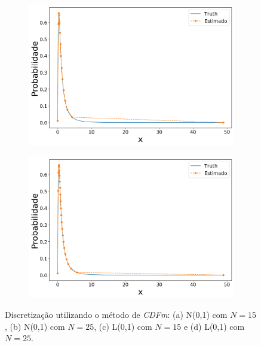 \begin{figure}[H]
	
	\begin{subfigure}[b]{0.45\textwidth}
		\centering 
		\includegraphics[width=\linewidth]{./figuras/CDFm_lognormal_15}
		\caption{}
		\label{fig:cdf_log15}
	\end{subfigure}
	\hfill
	\begin{subfigure}[b]{0.45\textwidth}
		\centering 
		\includegraphics[width=\linewidth]{./figuras/CDFm_lognormal_25}
		\caption{}
		\label{fig:cdf_log25}
	\end{subfigure}
	
	\caption{Discretização utilizando o método de \textit{CDFm}: (a) N(0,1) com $N = 15$, (b) N(0,1) com $N = 25$, (c) L(0,1) com $N = 15$ e (d) L(0,1) com $N = 25$.}
	\label{fig:cdfnorm}
\end{figure}

